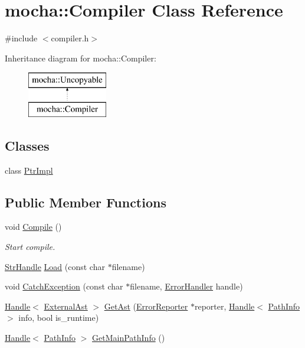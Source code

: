 \hypertarget{classmocha_1_1_compiler}{
\section{mocha::Compiler Class Reference}
\label{classmocha_1_1_compiler}
}


{\ttfamily \#include $<$compiler.h$>$}

Inheritance diagram for mocha::Compiler:\begin{figure}[H]
\begin{center}
\leavevmode
\includegraphics[height=2.000000cm]{classmocha_1_1_compiler}
\end{center}
\end{figure}
\subsection*{Classes}
\begin{DoxyCompactItemize}
\item 
class \hyperlink{classmocha_1_1_compiler_1_1_ptr_impl}{PtrImpl}
\end{DoxyCompactItemize}
\subsection*{Public Member Functions}
\begin{DoxyCompactItemize}
\item 
void \hyperlink{classmocha_1_1_compiler_a306a8eca89e0ff3eb9b529ec05379497}{Compile} ()
\begin{DoxyCompactList}\small\item\em Start compile. \end{DoxyCompactList}\item 
\hyperlink{classmocha_1_1_array_handle}{StrHandle} \hyperlink{classmocha_1_1_compiler_a3959e7a2bfd45449f8c1c0995fccbcc3}{Load} (const char $\ast$filename)
\item 
void \hyperlink{classmocha_1_1_compiler_ae2130cd13cc93fa0d25f0f6382713107}{CatchException} (const char $\ast$filename, \hyperlink{classmocha_1_1_handle}{ErrorHandler} handle)
\item 
\hyperlink{classmocha_1_1_handle}{Handle}$<$ \hyperlink{classmocha_1_1_external_ast}{ExternalAst} $>$ \hyperlink{classmocha_1_1_compiler_a178d58ee083f1da9c622e2c2e943300b}{GetAst} (\hyperlink{classmocha_1_1_error_reporter}{ErrorReporter} $\ast$reporter, \hyperlink{classmocha_1_1_handle}{Handle}$<$ \hyperlink{classmocha_1_1_path_info}{PathInfo} $>$ info, bool is\_\-runtime)
\item 
\hyperlink{classmocha_1_1_handle}{Handle}$<$ \hyperlink{classmocha_1_1_path_info}{PathInfo} $>$ \hyperlink{classmocha_1_1_compiler_a0f2c97e8cfeded647ed7c6db9ea9d8e5}{GetMainPathInfo} ()
\end{DoxyCompactItemize}
